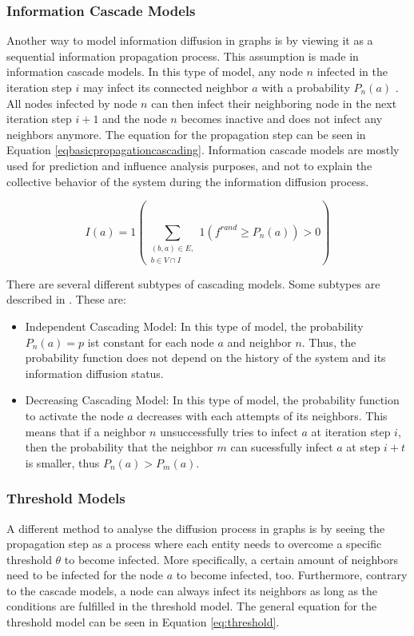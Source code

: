\subsubsection{Information Cascade Models}

Another way to model information diffusion in graphs is by viewing it as a 
sequential information propagation process. This assumption is made in
information cascade models. In this type of model, any node $n$ infected in the
iteration step $i$ may infect its connected neighbor $a$ with a probability $P_n(a)$
\cite{reviewinformationdiffusion}. All nodes infected by node $n$
can then infect their neighboring node in the next iteration step $i+1$
and the node $n$ becomes inactive and does not infect any neighbors anymore.
The equation for the propagation step can be seen in Equation 
\ref{eqbasicpropagationcascading}.
Information cascade models are mostly used for prediction and influence 
analysis purposes, and not to explain the collective behavior
of the system during the information diffusion process.

\begin{equation}
    I(a) = 1 (\sum\limits_{\substack{(b,a)\in E, \\ b \in V \cap I}}
    1(f^{rand}\geq P_n(a))>0) 
    \label{eqbasicpropagationcascading}
\end{equation}

There are several different subtypes of cascading models.
Some subtypes are described in \cite{diffusionbasics}. These are:

\begin{itemize}
    \item Independent Cascading Model: In this type of model, the 
    probability $P_n(a)=p$ ist constant for each node $a$ and neighbor $n$.
    Thus, the probability function does not depend on the history 
    of the system and its information diffusion status.
    \item Decreasing Cascading Model: In this type of model, the probability
    function to activate the node $a$ decreases with each attempts of its 
    neighbors. This means that if a neighbor $n$ unsuccessfully tries to infect
    $a$ at iteration step $i$, then the probability that the neighbor $m$
    can sucessfully infect $a$ at step $i+t$ is smaller, thus $P_n(a)>P_m(a)$.
\end{itemize}

\subsubsection{Threshold Models}
A different method to analyse the diffusion process in graphs is by seeing the
propagation step as a process where each entity needs to overcome a 
specific threshold $\theta$ to become infected. More specifically, 
a certain amount of neighbors need to be infected for the node $a$ to become 
infected, too. Furthermore, contrary to the cascade models, a node can always 
infect its neighbors as long as the conditions are fulfilled in the threshold 
model. The general equation for the threshold model can be seen in Equation
\ref{eq:threshold}.

